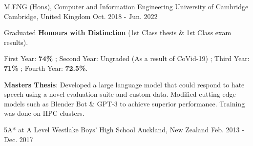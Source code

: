 

\begin{cventries}

  \cventry
    {M.ENG (Hons), Computer and Information Engineering} %
    {University of Cambridge} %
    {Cambridge, United Kingdom} %
    {Oct. 2018 - Jun. 2022} %
    {
      \begin{cvitems} %
        \item {Graduated \textbf{Honours with Distinction} (1st Class thesis \& 1st Class exam results).}
        \item {First Year: \textbf{74\%} ; Second Year: Ungraded (As a result of CoVid-19) ; Third Year: \textbf{71\%} ; Fourth Year: \textbf{72.5\%}.}
        \item {\textbf{Masters Thesis}: Developed a large language model that could respond to hate speech using a novel evaluation suite and custom data. Modified cutting edge models such as Blender Bot \& GPT-3 to achieve superior performance. Training was done on HPC clusters.}
      \end{cvitems}
    }

  \cventry
    {5A* at A Level} %
    {Westlake Boys' High School} %
    {Auckland, New Zealand} %
    {Feb. 2013 - Dec. 2017} %
    {}

\end{cventries}
